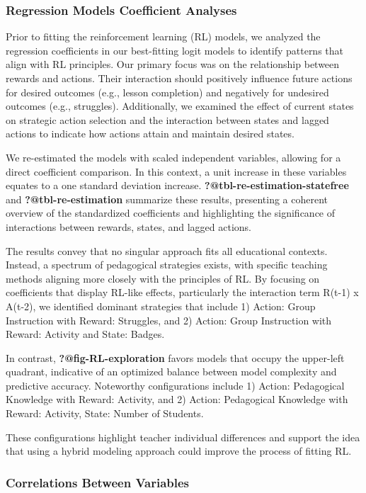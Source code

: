 \documentclass[
  number,
  preprint,
  3p,
  onecolumn]{elsarticle}
\begin{document}
\subsubsection{Regression Models Coefficient
Analyses}\label{regression-models-coefficient-analyses}

Prior to fitting the reinforcement learning (RL) models, we analyzed the
regression coefficients in our best-fitting logit models to identify
patterns that align with RL principles. Our primary focus was on the
relationship between rewards and actions. Their interaction should
positively influence future actions for desired outcomes (e.g., lesson
completion) and negatively for undesired outcomes (e.g., struggles).
Additionally, we examined the effect of current states on strategic
action selection and the interaction between states and lagged actions
to indicate how actions attain and maintain desired states.

We re-estimated the models with scaled independent variables, allowing
for a direct coefficient comparison. In this context, a unit increase in
these variables equates to a one standard deviation increase.
\textbf{?@tbl-re-estimation-statefree} and \textbf{?@tbl-re-estimation}
summarize these results, presenting a coherent overview of the
standardized coefficients and highlighting the significance of
interactions between rewards, states, and lagged actions.

The results convey that no singular approach fits all educational
contexts. Instead, a spectrum of pedagogical strategies exists, with
specific teaching methods aligning more closely with the principles of
RL. By focusing on coefficients that display RL-like effects,
particularly the interaction term R(t-1) x A(t-2), we identified
dominant strategies that include 1) Action: Group Instruction with
Reward: Struggles, and 2) Action: Group Instruction with Reward:
Activity and State: Badges.

In contrast, \textbf{?@fig-RL-exploration} favors models that occupy the
upper-left quadrant, indicative of an optimized balance between model
complexity and predictive accuracy. Noteworthy configurations include 1)
Action: Pedagogical Knowledge with Reward: Activity, and 2) Action:
Pedagogical Knowledge with Reward: Activity, State: Number of Students.

These configurations highlight teacher individual differences and
support the idea that using a hybrid modeling approach could improve the
process of fitting RL.

\subsubsection{Correlations Between
Variables}\label{correlations-between-variables}
\end{document}
